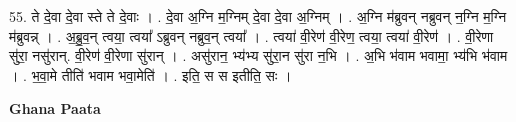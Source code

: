 \documentclass[17pt]{extarticle}
\begin{document}
55. ते दे॒वा दे॒वा स्ते ते दे॒वाः । . दे॒वा अ॒ग्नि म॒ग्निम् दे॒वा दे॒वा अ॒ग्निम् । . अ॒ग्नि म॑ब्रुवन् नब्रुवन् न॒ग्नि म॒ग्नि म॑ब्रुवन्न् । . अ॒ब्रु॒व॒न् त्वया॒ त्वया᳚ ऽब्रुवन् नब्रुव॒न् त्वया᳚ । . त्वया॑ वी॒रेण॑ वी॒रेण॒ त्वया॒ त्वया॑ वी॒रेण॑ । . वी॒रेणा सु॑रा॒ नसु॑रान्. वी॒रेण॑ वी॒रेणा सु॑रान् । . असु॑रान॒ भ्य॑भ्य सु॑रा॒न सु॑रा न॒भि । . अ॒भि भ॑वाम भवामा॒ भ्य॑भि भ॑वाम । . भ॒वा॒मे तीति॑ भवाम भवा॒मेति॑ । . इति॒ स स इतीति॒ सः । \newline

\textbf{Ghana Paata } \newline
\end{document}
